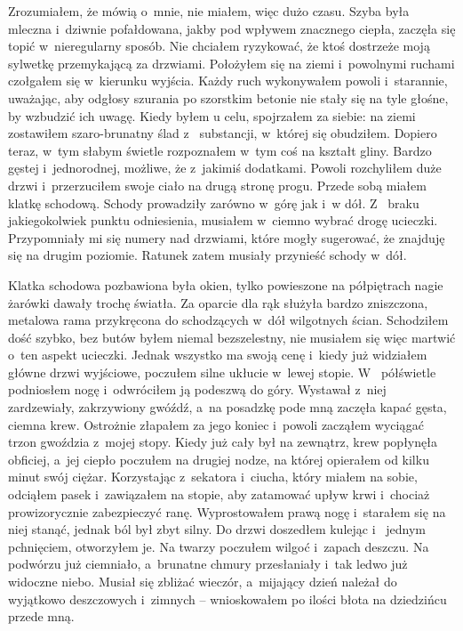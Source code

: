 Zrozumiałem, że mówią o~mnie, nie miałem, więc dużo czasu. Szyba była mleczna i~dziwnie pofałdowana, jakby pod 
wpływem znacznego ciepła, zaczęła się topić w~nieregularny sposób. Nie chciałem ryzykować, że ktoś dostrzeże moją 
sylwetkę przemykającą za drzwiami. Położyłem się na ziemi i~powolnymi ruchami czołgałem się w~kierunku wyjścia. Każdy 
ruch wykonywałem powoli i~starannie, uważając, aby odgłosy szurania po szorstkim betonie nie stały się na tyle 
głośne, by wzbudzić ich uwagę. Kiedy byłem u celu, spojrzałem za siebie: na ziemi zostawiłem szaro-brunatny ślad z~
substancji, w~której się obudziłem. Dopiero teraz, w~tym słabym świetle rozpoznałem w~tym coś na kształt gliny. 
Bardzo gęstej i~jednorodnej, możliwe, że z~jakimiś dodatkami. Powoli rozchyliłem duże drzwi i~przerzuciłem swoje 
ciało na drugą stronę progu. Przede sobą miałem klatkę schodową. Schody prowadziły zarówno w~górę jak i~w dół. Z~
braku jakiegokolwiek punktu odniesienia, musiałem w~ciemno wybrać drogę ucieczki. Przypomniały mi się numery nad 
drzwiami, które mogły sugerować, że znajduję się na drugim poziomie. Ratunek zatem musiały przynieść schody w~dół.

Klatka schodowa pozbawiona była okien, tylko powieszone na półpiętrach nagie żarówki dawały trochę światła. Za 
oparcie dla rąk służyła bardzo zniszczona, metalowa rama przykręcona do schodzących w~dół wilgotnych ścian. 
Schodziłem dość szybko, bez butów byłem niemal bezszelestny, nie musiałem się więc martwić o~ten aspekt ucieczki. 
Jednak wszystko ma swoją cenę i~kiedy już widziałem główne drzwi wyjściowe, poczułem silne ukłucie w~lewej stopie. W~
półświetle podniosłem nogę i~odwróciłem ją podeszwą do góry. Wystawał z~niej zardzewiały, zakrzywiony gwóźdź, a~na 
posadzkę pode mną zaczęła kapać gęsta, ciemna krew. Ostrożnie złapałem za jego koniec i~powoli zacząłem wyciągać 
trzon gwoździa z~mojej stopy. Kiedy już cały był na zewnątrz, krew popłynęła obficiej, a~jej ciepło poczułem na 
drugiej nodze, na której opierałem od kilku minut swój ciężar. Korzystając z~sekatora i~ciucha, który miałem na 
sobie, odciąłem pasek i~zawiązałem na stopie, aby zatamować upływ krwi i~chociaż prowizorycznie zabezpieczyć ranę. 
Wyprostowałem prawą nogę i~starałem się na niej stanąć, jednak ból był zbyt silny. Do drzwi doszedłem kulejąc i~
jednym pchnięciem, otworzyłem je. Na twarzy poczułem wilgoć i~zapach deszczu. Na podwórzu już ciemniało, a~brunatne 
chmury przesłaniały i~tak ledwo już widoczne niebo. Musiał się zbliżać wieczór, a~mijający dzień należał do wyjątkowo 
deszczowych i~zimnych -- wnioskowałem po ilości błota na dziedzińcu przede mną.

